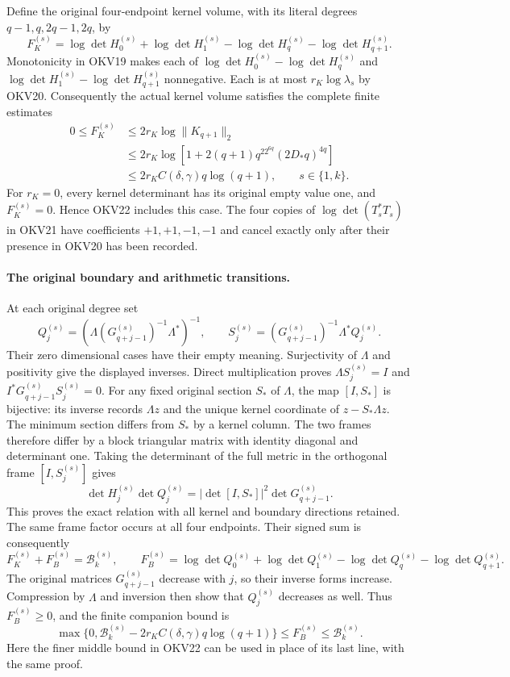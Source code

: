 \documentclass[11pt,a4paper]{article}
\begin{document}
Define the original four-endpoint kernel volume, with its literal
degrees $q-1,q,2q-1,2q$, by
\[
 F_K^{(s)}=
 \log\det H_0^{(s)}+\log\det H_1^{(s)}
       -\log\det H_q^{(s)}-\log\det H_{q+1}^{(s)}.
 \tag{OKV21}
\]
Monotonicity in OKV19 makes each of
$\log\det H_0^{(s)}-\log\det H_q^{(s)}$ and
$\log\det H_1^{(s)}-\log\det H_{q+1}^{(s)}$ nonnegative.
Each is at most $r_K\log\lambda_s$ by OKV20. Consequently the
actual kernel volume satisfies the complete finite estimates
\[
 \boxed{\begin{aligned}
 0\le F_K^{(s)}
 &\le2r_K\log\|K_{q+1}\|_2\\
 &\le2r_K\log\left[1+2(q+1)q^22^{6q}(2D_*q)^{4q}\right]\\
 &\le2r_K C(\delta,\gamma)q\log(q+1),
                    \qquad s\in\{1,k\}.
 \end{aligned}}
 \tag{OKV22}
\]
For $r_K=0$, every kernel determinant has its original empty value
one, and $F_K^{(s)}=0$. Hence OKV22 includes this case.
The four copies of $\log\det(T_s^*T_s)$ in OKV21 have coefficients
$+1,+1,-1,-1$ and cancel exactly only after their presence in
OKV20 has been recorded.

\paragraph{The original boundary and arithmetic transitions.}
At each original degree set
\[
 Q_j^{(s)}=
   \left(\Lambda (G_{q+j-1}^{(s)})^{-1}\Lambda^*\right)^{-1},
 \qquad
 S_j^{(s)}=(G_{q+j-1}^{(s)})^{-1}\Lambda^*Q_j^{(s)}.
 \tag{OKV23}
\]
Their zero dimensional cases have their empty meaning. Surjectivity
of $\Lambda$ and positivity give the displayed inverses. Direct
multiplication proves $\Lambda S_j^{(s)}=I$ and
$I^*G_{q+j-1}^{(s)}S_j^{(s)}=0$.
For any fixed original section $S_*$ of $\Lambda$, the map $[I,S_*]$
is bijective: its inverse records $\Lambda z$ and the unique kernel
coordinate of $z-S_*\Lambda z$. The minimum section differs from
$S_*$ by a kernel column. The two frames therefore differ by a
block triangular matrix with identity diagonal and determinant one.
Taking the determinant of the full metric in the orthogonal frame
$[I,S_j^{(s)}]$ gives
\[
 \det H_j^{(s)}\det Q_j^{(s)}
       =|\det[I,S_*]|^2\det G_{q+j-1}^{(s)}.
 \tag{OKV24}
\]
This proves the exact relation with all kernel and boundary directions
retained. The same frame factor occurs at all four endpoints.
Their signed sum is consequently
\[
 F_K^{(s)}+F_B^{(s)}=\mathcal B_k^{(s)},\qquad
 F_B^{(s)}=\log\det Q_0^{(s)}+\log\det Q_1^{(s)}
               -\log\det Q_q^{(s)}-\log\det Q_{q+1}^{(s)}.
 \tag{OKV25}
\]
The original matrices $G_{q+j-1}^{(s)}$ decrease with $j$, so their
inverse forms increase. Compression by $\Lambda$ and inversion then
show that $Q_j^{(s)}$ decreases as well. Thus $F_B^{(s)}\ge0$,
and the finite companion bound is
\[
 \max\{0,\mathcal B_k^{(s)}-2r_K C(\delta,\gamma)q\log(q+1)\}
       \le F_B^{(s)}\le\mathcal B_k^{(s)}.
 \tag{OKV26}
\]
Here the finer middle bound in OKV22 can be used in place of its
last line, with the same proof.
\end{document}
